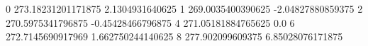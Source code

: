 0 273.18231201171875 2.1304931640625
1 269.0035400390625 -2.04827880859375
2 270.5975341796875 -0.45428466796875
4 271.05181884765625 0.0
6 272.7145690917969 1.662750244140625
8 277.902099609375 6.85028076171875
